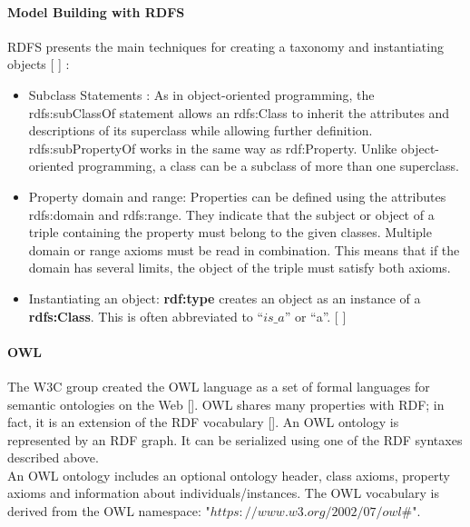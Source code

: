                 
        
        
        

            \paragraph{Model Building with RDFS}
            RDFS presents the main techniques for creating a taxonomy and instantiating objects [ ] : 

            \begin{itemize}
                \item Subclass Statements : As in object-oriented programming, the rdfs:subClassOf statement allows an rdfs:Class to inherit the attributes and descriptions of its superclass while allowing further definition. rdfs:subPropertyOf works in the same way as rdf:Property. Unlike object-oriented programming, a class can be a subclass of more than one superclass. 
                \item Property domain and range: Properties can be defined using the attributes rdfs:domain and rdfs:range. They indicate that the subject or object of a triple containing the property must belong to the given classes. Multiple domain or range axioms must be read in combination. This means that if the domain has several limits, the object of the triple must satisfy both axioms. 
                \item Instantiating an object: \textbf{rdf:type} creates an object as an instance of a \textbf{rdfs:Class}. This is often abbreviated to “$is\_a$” or “a”. [ ] 
            \end{itemize}
    
            \paragraph{OWL}
            The W3C group created the OWL language as a set of formal languages for semantic ontologies on the Web []. OWL shares many properties with RDF; in fact, it is an extension of the RDF vocabulary []. An OWL ontology is represented by an RDF graph. It can be serialized using one of the RDF syntaxes described above. \\
        
            An OWL ontology includes an optional ontology header, class axioms, property axioms and information about individuals/instances. The OWL vocabulary is derived from the OWL namespace: "$https://www.w3.org/2002/07/owl\#$". 
        

